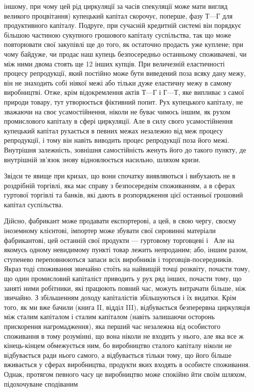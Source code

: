 \parcont{}  %
іншому, при чому цей рід циркуляції за часів спекуляції може
мати вигляд великого процвітання) купецький капітал скорочує,
поперше, фазу $Т — Г$ для продуктивного капіталу. Подруге, при
сучасній кредитній системі він порядкує більшою частиною
сукупного грошового капіталу суспільства, так що може повторювати
свої закупівлі ще до того, як остаточно продасть уже
куплене; при чому байдуже, чи продає наш купець безпосередньо
останньому споживачеві, чи між ними двома стоять ще
12 інших купців. При величезній еластичності процесу репродукції,
який постійно може бути виведений поза всяку дану
межу, він не знаходить собі ніякої межі або тільки дуже еластичну
межу в самому виробництві. Отже, крім відокремлення актів
$Т — Г$ і $Г — Т$, яке випливає з самої природи товару, тут утворюється
фіктивний попит. Рух купецького капіталу, не зважаючи
на своє усамостійнення, ніколи не буває чимось іншим, як рухом
промислового капіталу в сфері циркуляції. Але в силу свого
усамостійнення купецький капітал рухається в певних межах незалежно
від меж процесу репродукції, і тому він навіть виводить
процес репродукції поза його межі. Внутрішня залежність, зовнішня
самостійність женуть його до такого пункту, де внутрішній
зв’язок знову відновлюється насильно, шляхом кризи.

Звідси те явище при кризах, що вони спочатку виявляються
і вибухають не в роздрібній торгівлі, яка має справу з безпосереднім
споживанням, а в сферах гуртової торгівлі та банків,
які дають в розпорядження цієї останньої грошовий капітал
суспільства.

Дійсно, фабрикант може продавати експортерові, а цей, в свою
чергу, своєму іноземному клієнтові, імпортер може збувати
свої сировинні матеріали фабрикантові, цей останній свої продукти
— гуртовому торговцеві і~ Але на якомусь одному
невидимому пункті товар лежить непроданим; або, іншим разом,
ступенево переповнюються запаси всіх виробників і торговців-посередників.
Якраз тоді споживання звичайно стоїть на найвищій
точці розквіту, почасти тому, що один промисловий капіталіст
приводить у рух ряд інших, почасти тому, що заняті
ними робітники, які працюють повний час, можуть витрачати
більше, ніж звичайно. З збільшенням доходу капіталістів збільшуються
і їх видатки. Крім того, як ми вже бачили (книга II,
відділ III), відбувається безперервна циркуляція між сталим капіталом
і сталим капіталом (навіть залишаючи осторонь прискорення
нагромадження), яка перший час незалежна від особистого
споживання в тому розумінні, що вона ніколи не входить
у нього, але яка все ж кінець-кінцем обмежується ним,
бо виробництво сталого капіталу ніколи не відбувається ради
нього самого, а відбувається тільки тому, що його більше
вживається у сферах виробництва, продукти яких входять в особисте
споживання. Однак, протягом певного часу це виробництво
може спокійно йти своїм шляхом, підохочуване сподіваним
\parbreak{}  %

